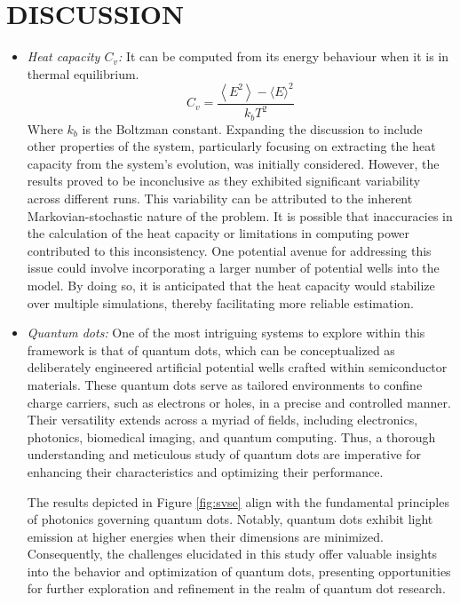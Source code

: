 \documentclass[%
 reprint,
 amsmath,amssymb,
 aps,
]{revtex4-2}
\begin{document}
\section{DISCUSSION}

\begin{itemize}
    \item \textit{Heat capacity $C_v$:} It can be computed from its energy behaviour when it is in thermal equilibrium. 
\begin{equation}
    C_v=\frac{\left\langle E^2\right\rangle - \langle E\rangle^2}{k_b T^2}
\end{equation}
Where $k_b$ is the Boltzman constant.
Expanding the discussion to include other properties of the system, particularly focusing on extracting the heat capacity from the system's evolution, was initially considered. However, the results proved to be inconclusive as they exhibited significant variability across different runs. This variability can be attributed to the inherent Markovian-stochastic nature of the problem. It is possible that inaccuracies in the calculation of the heat capacity or limitations in computing power contributed to this inconsistency. One potential avenue for addressing this issue could involve incorporating a larger number of potential wells into the model. By doing so, it is anticipated that the heat capacity would stabilize over multiple simulations, thereby facilitating more reliable estimation.
\item \textit{Quantum dots:}
One of the most intriguing systems to explore within this framework is that of quantum dots, which can be conceptualized as deliberately engineered artificial potential wells crafted within semiconductor materials. These quantum dots serve as tailored environments to confine charge carriers, such as electrons or holes, in a precise and controlled manner. Their versatility extends across a myriad of fields, including electronics, photonics, biomedical imaging, and quantum computing. Thus, a thorough understanding and meticulous study of quantum dots are imperative for enhancing their characteristics and optimizing their performance.

The results depicted in Figure \ref{fig:svse} align with the fundamental principles of photonics governing quantum dots. Notably, quantum dots exhibit light emission at higher energies when their dimensions are minimized. Consequently, the challenges elucidated in this study offer valuable insights into the behavior and optimization of quantum dots, presenting opportunities for further exploration and refinement in the realm of quantum dot research.

\end{itemize}
\end{document}
